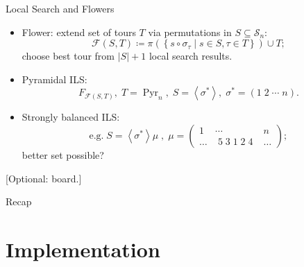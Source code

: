 \documentclass[
  size=8pt,
  style=klope,
  paper=screen,
  mode=present,
  nohandoutpagebreaks,
  pauseslide,
  hlsections,
  fleqn,
]{powerdot}
\def\board{{\color{green} [Optional: board.]}}
\def\eqitspace{\vspace{-5mm}}
\begin{document}
\begin{slide}{Local Search and Flowers}
  \begin{itemize}
  \item
    Flower: extend set of tours $T$ via permutations in $S \subseteq \mathcal{S}_n$:
    \begin{equation}
      \mathcal{F}\left(S,T\right) \coloneqq \pi\left(\left\{ s \circ \sigma_\tau \mid s \in S, \tau \in T\right\}\right) \cup T;
    \end{equation}
  choose best tour from $\lvert S \rvert+1$ local search results.
  \item
    Pyramidal ILS:
    \begin{equation}
      F_{\mathcal{F}\left(S,T\right)}, \;
      T = \operatorname{Pyr}_n, \;
      S = \left<\sigma^\ast\right>, \;
      \sigma^\ast = \left(1\;2\;\cdots\;n\right).
    \end{equation}
  \eqitspace%
  \item
  Strongly balanced ILS:
    \begin{equation}
      \text{e.g.} \; S = \left<\sigma^\ast\right>\mu \;,\;
      \mu =
      \begin{pmatrix}
        1 & \cdots & n \\
        \ldots & \; 5 \; 3 \; 1 \; 2 \; 4 \; & \ldots
      \end{pmatrix};
    \end{equation}
    better set possible?
  \end{itemize}
  \board
\end{slide}

\begin{slide}[toc=,bm=]{Recap}
\tableofcontents[content=currentsection,type=1]
\end{slide}

\section[template=wideslide]{Implementation}
\end{document}
